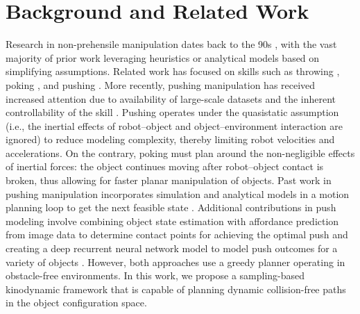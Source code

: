 \section{Background and Related Work}\label{sec:background}

Research in non-prehensile manipulation dates back to the 90s \cite{lynch1999dynamic, ruggiero2018nonprehensile, toussaint2018differentiable}, with the vast majority of prior work leveraging heuristics or analytical models based on simplifying assumptions. Related work has focused on skills such as throwing \cite{zeng2020tossingbot}, poking \cite{Huang-1997-14452}, and pushing \cite{woodruff2017planning,RSS2020Changkyu,mason1986mechanics}.
More recently, pushing manipulation has received increased attention due to availability of large-scale datasets and the inherent controllability of the skill \cite{bauza2019omnipush}. Pushing operates under the quasistatic assumption (i.e., the inertial effects of robot--object and object--environment interaction are ignored) to reduce modeling complexity, thereby limiting robot velocities and accelerations. On the contrary, poking must plan around the non-negligible effects of inertial forces: the object continues moving after robot--object contact is broken, thus allowing for faster planar manipulation of objects. Past work in pushing manipulation incorporates simulation and analytical models in a motion planning loop to get the next feasible state \cite{zito2012two}\cite{zhou2019pushing}. Additional contributions in push modeling involve combining object state estimation with affordance prediction from image data to determine contact points for achieving the optimal push \cite{kloss2020accurate} and creating a deep recurrent neural network model to model push outcomes for a variety of objects \cite{li2018push}. However, both approaches use a greedy planner operating in obstacle-free environments. In this work, we propose a sampling-based kinodynamic framework that is capable of planning dynamic collision-free paths in the object configuration space. 

